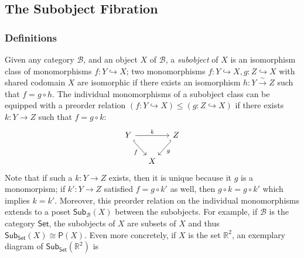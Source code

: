 \documentclass[12pt]{article}
\theoremstyle{definition}
\theoremstyle{remark}
\newcommand{\set}{\mathsf{Set}} %
\newcommand{\sub}{\mathsf{Sub}} %
\newcommand{\pow}{\mathsf{P}} %
\newcommand{\catB}{\mathcal{B}}
\begin{document}
\subsection{The Subobject Fibration}

\subsubsection{Definitions}

Given any category $\catB$, and an object $X$ of $\catB$, a \textit{subobject} of $X$ is an isomorphism class of monomorphisms $f : Y \hookrightarrow X$; two monomorphisms $f : Y \hookrightarrow X, g : Z \hookrightarrow
X$ with shared codomain $X$ are isomorphic if there exists an isomorphism $h : Y \xrightarrow{\sim} Z$ such that $f = g \circ h$. The individual monomorphisms of a subobject class can be equipped with a preorder relation $( f : Y \hookrightarrow X ) \leq ( g : Z \hookrightarrow X )$ if there exists $k : Y \rightarrow Z$ such that $f = g \circ k$:
\begin{equation}
    \begin{tikzcd}[column sep=small]
        Y \ar[rd, hook, "f"'] \ar[rr, "k"] &   & Z \ar[ld, hook', "g"]\\
          & X &
    \end{tikzcd}
\end{equation}
Note that if such a $k : Y \to Z$ exists, then it is unique because it $g$ is a monomorpism; if $k' : Y \rightarrow Z$ satisfied $f = g \circ k'$ as well, then $g \circ k = g \circ k'$ which implies $k = k'$. Moreover, this preorder relation on the individual monomorphisms extends to a poset $\sub_{\catB}(X)$ between the subobjects. For example, if $\catB$ is the category $\set$, the subobjects of $X$ are subsets of $X$ and thus $\sub_{\set}(X) \cong \pow(X)$. Even more concretely, if $X$ is the set $\mathbb{R}^2$, an exemplary diagram of $\sub_{\set}(\mathbb{R}^2)$ is
\end{document}
